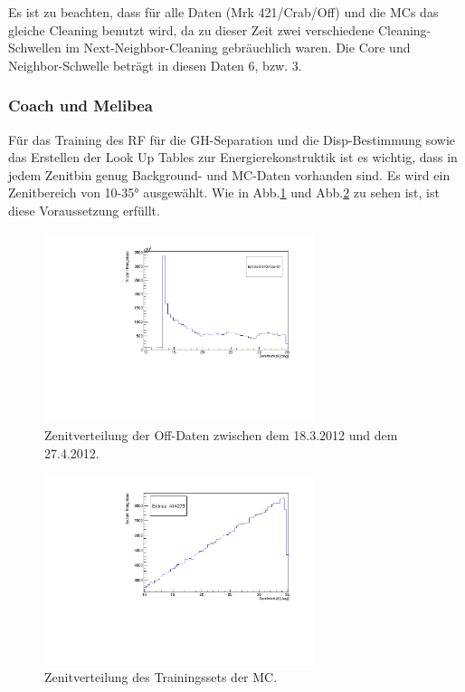 Es ist zu beachten, dass für alle Daten (Mrk 421/Crab/Off) und die MCs das gleiche Cleaning benutzt wird, da zu dieser Zeit zwei verschiedene Cleaning-Schwellen im Next-Neighbor-Cleaning gebräuchlich waren.
Die Core und Neighbor-Schwelle beträgt in diesen Daten 6, bzw. 3.


\subsubsection{Coach und Melibea}
Für das Training des RF für die GH-Separation und die Disp-Bestimmung sowie das Erstellen der Look Up Tables zur Energierekonstruktik ist es wichtig, dass in jedem Zenitbin genug Background- und MC-Daten vorhanden sind.
Es wird ein Zenitbereich von 10-35° ausgewählt.
Wie in Abb.\ref{Datenset2_Zenitverteilung_Off} und Abb.\ref{Datenset2_Zenitverteilung_MC} zu sehen ist, ist diese Voraussetzung erfüllt.

\begin{figure}
    \centering
    \includegraphics[width=0.7\textwidth]{./Plots/04_MrkAnalyse/Datenset2/Datenset2_Background_MPointingPos1_fZd.pdf}
    \caption{Zenitverteilung der Off-Daten zwischen dem 18.3.2012 und dem 27.4.2012.}
    \label{Datenset2_Zenitverteilung_Off}
\end{figure}

\begin{figure}
    \centering
    \includegraphics[width=0.7\textwidth]{./Plots/04_MrkAnalyse/Datenset2/Datenset2_MC_MPointingPos1_fZd.pdf}
    \caption{Zenitverteilung des Trainingssets der MC.}
    \label{Datenset2_Zenitverteilung_MC}
\end{figure}

